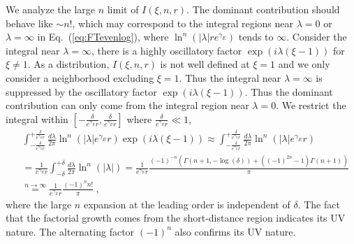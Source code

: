 \documentclass[a4paper,11pt]{article}
\begin{document}
We analyze the large $n$ limit of $I(\xi, n,r)$. The dominant contribution should behave like $\sim n!$, which may correspond to the integral regions near $\lambda = 0$ or $\lambda= \infty$ in Eq.~(\ref{eq:FTevenlog}), where $\ln^{n}\left(|\lambda| r e^{\gamma_E} \right)$ tends to $\infty$. Consider the integral near $\lambda= \infty$, there is a highly oscillatory factor $\exp \left(i \lambda (\xi-1)\right)$ for $\xi \neq 1$. As a distribution, $I(\xi, n,r)$ is not well defined at $\xi=1$ and we only consider a neighborhood excluding $\xi=1$. Thus the integral near $\lambda= \infty$ is suppressed by the oscillatory factor $\exp \left(i \lambda (\xi-1)\right)$. Thus the dominant contribution can only come from the integral region near $\lambda=0$. We restrict the integral within $[-\frac{\delta}{e^{\gamma_E} r}, \frac{\delta}{e^{\gamma_E} r}]$ where $\frac{\delta}{e^{\gamma_E} r} \ll 1$, 
\begin{align}\label{eq:Lnana}
&\int_{-\frac{\delta}{e^{\gamma_E} r}}^{+\frac{\delta}{e^{\gamma_E} r}} \frac{d \lambda}{2 \pi} \ln^{n}\left(|\lambda| e^{\gamma_E} r\right) \exp \left(i \lambda (\xi-1)\right) \approx \int_{-\frac{\delta}{e^{\gamma_E} r}}^{+\frac{\delta}{e^{\gamma_E} r}} \frac{d \lambda}{2 \pi} \ln^{n}\left(|\lambda| e^{\gamma_E} r\right) \nonumber\\
&= \frac{1}{e^{\gamma_E} r}\int_{-\delta}^{+\delta} \frac{d \lambda}{2 \pi} \ln^{n}\left(|\lambda|\right)
= \frac{1}{e^{\gamma_E} r}\frac{(-1)^{-n} \left(\Gamma (n+1,-\log (\delta ))+\left((-1)^{2 n}-1\right) \Gamma(n+1)\right)}{\pi} \nonumber\\
&\stackrel{n \rightarrow \infty}{=} \frac{1}{e^{\gamma_E} r}\frac{(-1)^{n}n!}{\pi}  \ ,
\end{align}
where the large $n$ expansion at the leading order is independent of $\delta$. The fact that the factorial growth comes from the short-distance region indicates its UV nature. The alternating factor $(-1)^n$ also confirms its UV nature. 
\end{document}
